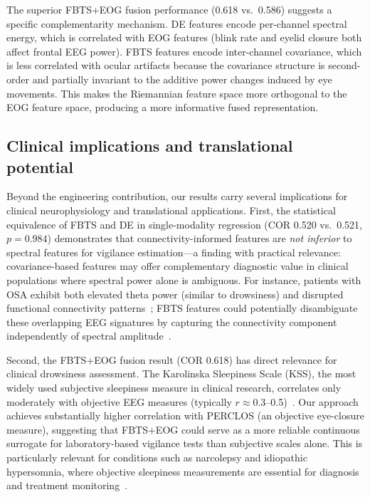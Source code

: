 \documentclass{iopjournal}
\begin{document}
The superior FBTS+EOG fusion performance (0.618 vs.\ 0.586) suggests a specific complementarity mechanism. DE features encode per-channel spectral energy, which is correlated with EOG features (blink rate and eyelid closure both affect frontal EEG power). FBTS features encode inter-channel covariance, which is less correlated with ocular artifacts because the covariance structure is second-order and partially invariant to the additive power changes induced by eye movements. This makes the Riemannian feature space more orthogonal to the EOG feature space, producing a more informative fused representation.

\subsection{Clinical implications and translational potential}

Beyond the engineering contribution, our results carry several implications for clinical neurophysiology and translational applications. First, the statistical equivalence of FBTS and DE in single-modality regression (COR 0.520 vs.\ 0.521, $p=0.984$) demonstrates that connectivity-informed features are \emph{not inferior} to spectral features for vigilance estimation---a finding with practical relevance: covariance-based features may offer complementary diagnostic value in clinical populations where spectral power alone is ambiguous. For instance, patients with OSA exhibit both elevated theta power (similar to drowsiness) and disrupted functional connectivity patterns~\cite{zhang2022eegbased}; FBTS features could potentially disambiguate these overlapping EEG signatures by capturing the connectivity component independently of spectral amplitude~\cite{dimitriadis2021functional}.

Second, the FBTS+EOG fusion result (COR 0.618) has direct relevance for clinical drowsiness assessment. The Karolinska Sleepiness Scale (KSS), the most widely used subjective sleepiness measure in clinical research, correlates only moderately with objective EEG measures (typically $r \approx 0.3$--0.5)~\cite{kaida2006validation}. Our approach achieves substantially higher correlation with PERCLOS (an objective eye-closure measure), suggesting that FBTS+EOG could serve as a more reliable continuous surrogate for laboratory-based vigilance tests than subjective scales alone. This is particularly relevant for conditions such as narcolepsy and idiopathic hypersomnia, where objective sleepiness measurements are essential for diagnosis and treatment monitoring~\cite{littner2005practice}.
\end{document}
